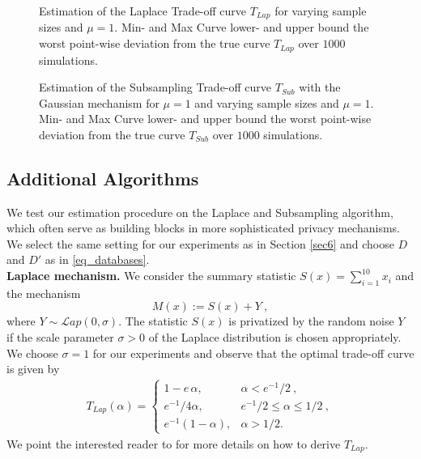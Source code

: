 \begin{figure*}[h!]
    \centering
    \hfill
    \hfill
    \vspace{-0.2cm}
  \caption{Estimation of the Laplace Trade-off curve $T_{Lap}$ for varying sample sizes and $\mu=1$. Min- and Max Curve lower- and upper bound the worst point-wise deviation from the true curve $T_{Lap}$ over $1000$ simulations.}
    \label{fig:laplace}
\vspace{-0.1cm}
    \centering
    \hfill
    \hfill
    \vspace{-0.2cm}
     \caption{Estimation of the Subsampling Trade-off curve $T_{Sub}$ with the Gaussian mechanism for $\mu=1$ and varying sample sizes and $\mu=1$. Min- and Max Curve lower- and upper bound the worst point-wise deviation from the true curve $T_{Sub}$ over $1000$ simulations.}
    \label{fig:subsampling}
\end{figure*}





\subsection{Additional Algorithms}
We test our estimation procedure on the Laplace and Subsampling algorithm, which often serve as building blocks in more sophisticated privacy mechanisms. We select the same setting for our experiments as in Section \ref{sec6} and choose $D$ and $D'$ as in \eqref{eq_databases}. \\

\noindent \textbf{Laplace mechanism.} We consider the summary statistic $S(x)= \sum_{i=1}^{10} x_i$ and the mechanism
\begin{equation*}
    M(x):= S(x)+Y~,
\end{equation*}
where $Y\sim \mathcal Lap(0, \sigma)$. The statistic $S(x)$ is privatized by the random noise $Y$ if the scale parameter $\sigma > 0$ of the Laplace distribution is chosen appropriately. We choose $\sigma = 1$ for our experiments and observe that the optimal trade-off curve is given by 
\begin{align*}
    T_{Lap}(\alpha)=\begin{cases}
        1- e \, \alpha,  &\alpha<e^{-1}/2~,\\
        e^{-1}/4 \alpha,  &e^{-1}/2\leq \alpha\leq 1/2~,\\
        e^{-1}(1-\alpha), &\alpha>1/2.
    \end{cases}
\end{align*}
We point the interested reader to \cite{Dong2022} for more details on how to derive $T_{Lap}$. \\

